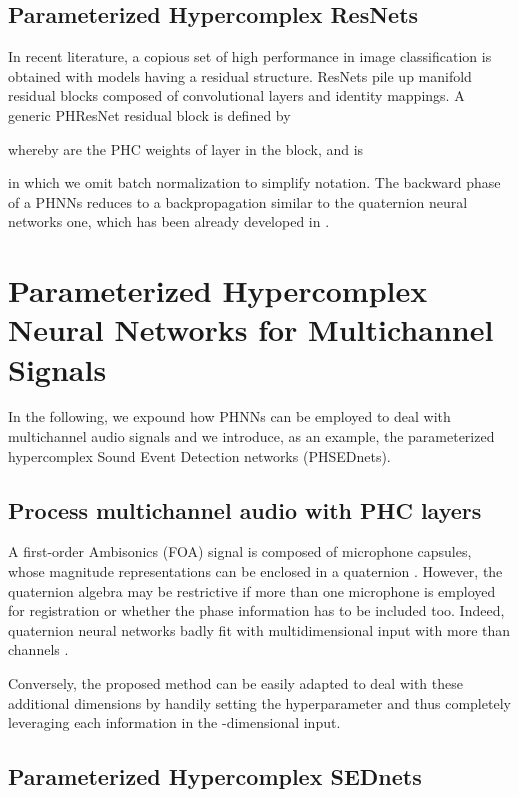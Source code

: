 \documentclass[lettersize,journal]{IEEEtran}
\begin{document}
\subsection{Parameterized Hypercomplex ResNets}
In recent literature, a copious set of high performance in image classification is obtained with models having a residual structure. ResNets \cite{Resnet2016} pile up manifold residual blocks composed of convolutional layers and identity mappings. A generic PHResNet residual block is defined by


whereby  are the PHC weights of layer  in the block, and  is


\noindent in which we omit batch normalization to simplify notation.
The backward phase of a PHNNs reduces to a backpropagation similar to the quaternion neural networks one, which has been already developed in \cite{NittaQBack1995, ParcolletAIR2019, ParcolletICLR2019}. 


\section{Parameterized Hypercomplex Neural Networks for Multichannel Signals}
\label{sec:phc_audio}

In the following, we expound how PHNNs can be employed to deal with multichannel audio signals and we introduce, as an example, the parameterized hypercomplex Sound Event Detection networks (PHSEDnets).

\subsection{Process multichannel audio with PHC layers}
A first-order Ambisonics (FOA) signal is composed of  microphone capsules, whose magnitude representations can be enclosed in a quaternion \cite{ComminielloICASSP2019a, RicciardiMLSP2020}. However, the quaternion algebra may be restrictive if more than one microphone is employed for registration or whether the phase information has to be included too. Indeed, quaternion neural networks badly fit with multidimensional input with more than  channels \cite{Grassucci2022DualQ}.

Conversely, the proposed method can be easily adapted to deal with these additional dimensions by handily setting the hyperparameter  and thus completely leveraging each information in the -dimensional input.

\subsection{Parameterized Hypercomplex SEDnets}
\end{document}
